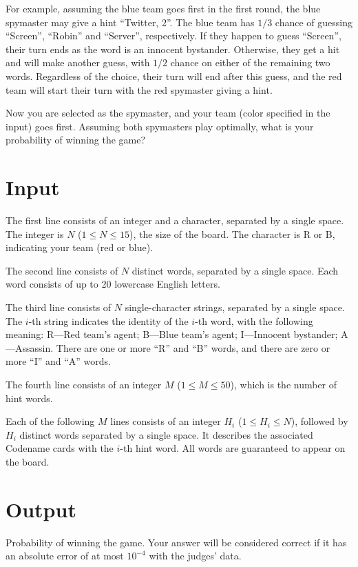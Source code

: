 For example, assuming the blue team goes first in the first round, the blue spymaster may give a hint ``Twitter, 2''. The blue team has $1/3$ chance of guessing ``Screen'', ``Robin'' and ``Server'', respectively. If they happen to guess ``Screen'', their turn ends as the word is an innocent bystander. Otherwise, they get a hit and will make another guess, with $1/2$ chance on either of the remaining two words. Regardless of the choice, their turn will end after this guess, and the red team will start their turn with the red spymaster giving a hint.

Now you are selected as the spymaster, and your team (color specified in the input) goes first. Assuming both spymasters play optimally, what is your probability of winning the game?

\section*{Input}

The first line consists of an integer and a character, separated by a single space. The integer is $N$ ($1 \leq N \leq 15$), the size of the board. The character is R or B, indicating your team (red or blue).

The second line consists of $N$ distinct words, separated by a single space. Each word consists of up to 20 lowercase English letters.

The third line consists of $N$ single-character strings, separated by a single space. The $i$-th string indicates the identity of the $i$-th word, with the following meaning: R---Red team's agent; B---Blue team's agent; I---Innocent bystander; A---Assassin. There are one or more ``R'' and ``B'' words, and there are zero or more ``I'' and ``A'' words.

The fourth line consists of an integer $M$ ($1 \leq M \leq 50$), which is the number of hint words.

Each of the following $M$ lines consists of an integer $H_i$ ($1 \leq H_i \leq N$), followed by $H_i$ distinct words separated by a single space. It describes the associated Codename cards with the $i$-th hint word. All words are guaranteed to appear on the board.

\section*{Output}

Probability of winning the game. Your answer will be considered correct if it has an absolute error of at most $10^{-4}$ with the judges' data.

